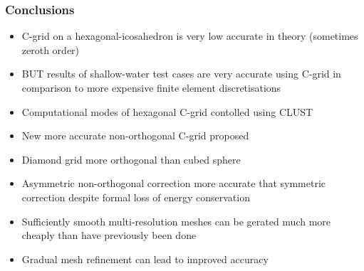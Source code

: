 \makeatletter{}\begin{frame}
\frametitle{Conclusions}

\begin{itemize}[<+->]

\item C-grid on a hexagonal-icosahedron is very low accurate in theory (sometimes zeroth order)

\item BUT results of shallow-water test cases are very accurate using C-grid in comparison to more expensive finite element discretisations

\item Computational modes of hexagonal C-grid contolled using CLUST

\item New more accurate non-orthogonal C-grid proposed

\item Diamond grid more orthogonal than cubed sphere

\item Asymmetric non-orthogonal correction more accurate that symmetric correction despite formal loss of energy conservation

\item Sufficiently smooth multi-resolution meshes can be gerated much more cheaply than have previously been done

\item Gradual mesh refinement can lead to improved accuracy

\end{itemize}

\end{frame}

 


